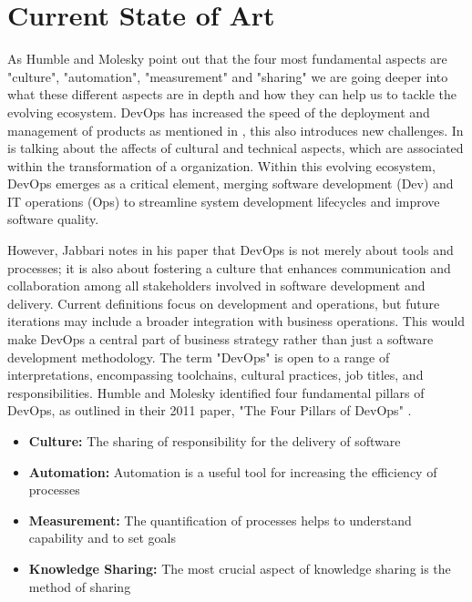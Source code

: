 
\chapter{Current State of Art}

\label{Chapter2} %

As Humble and Molesky \cite{HumbleMolesky2011} point out that the four most fundamental aspects are "culture", "automation", "measurement" and "sharing" we are going deeper into what these different aspects are in depth and how they can help us to tackle the evolving ecosystem. DevOps has increased the speed of the deployment and management of products as mentioned in \cite{Zhu2016DevOps}, this also introduces new challenges. In \cite{Zhu2016DevOps} is talking about the affects of cultural and technical aspects, which are associated within the transformation of a organization.
Within this evolving ecosystem, DevOps emerges as a critical element, merging software development (Dev) and IT operations (Ops) to streamline system development lifecycles and improve software quality.

However, Jabbari \cite{Jabbari2016} notes in his paper that DevOps is not merely about tools and processes; it is also about fostering a culture that enhances communication and collaboration among all stakeholders involved in software development and delivery. Current definitions focus on development and operations, but future iterations may include a broader integration with business operations. This would make DevOps a central part of business strategy rather than just a software development methodology. The term "DevOps" is open to a range of interpretations, encompassing toolchains, cultural practices, job titles, and responsibilities. Humble and Molesky identified four fundamental pillars of DevOps, as outlined in their 2011 paper, "The Four Pillars of DevOps" \cite{HumbleMolesky2011}.

\begin{itemize}
    \item \textbf{Culture:} The sharing of responsibility for the delivery of software
    \item \textbf{Automation:} Automation is a useful tool for increasing the efficiency of processes
    \item \textbf{Measurement:} The quantification of processes helps to understand capability and to set goals
    \item \textbf{Knowledge Sharing:} The most crucial aspect of knowledge sharing is the method of sharing
\end{itemize}


